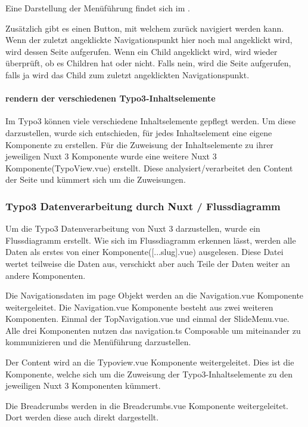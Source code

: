 Eine Darstellung der Menüführung findet sich im . 

Zusätzlich gibt es einen Button, mit welchem zurück navigiert werden kann. Wenn der zuletzt angeklickte Navigationspunkt hier noch mal angeklickt wird, wird dessen Seite aufgerufen. Wenn ein Child angeklickt wird, wird wieder überprüft, ob es Children hat oder nicht. Falls nein, wird die Seite aufgerufen, falls ja wird das Child zum zuletzt angeklickten Navigationspunkt. 

\paragraph{rendern der verschiedenen Typo3-Inhaltselemente}
Im Typo3 können viele verschiedene Inhaltselemente gepflegt werden. Um diese darzustellen, wurde sich entschieden, für jedes Inhaltselement eine eigene Komponente zu erstellen. Für die Zuweisung der Inhaltselemente zu ihrer jeweiligen Nuxt 3 Komponente wurde eine weitere Nuxt 3 Komponente(TypoView.vue) erstellt. Diese analysiert/verarbeitet den Content der Seite und kümmert sich um die Zuweisungen.

\subsubsection{Typo3 Datenverarbeitung durch Nuxt / Flussdiagramm}
\label{sec:Typo3 Datenverarbeitung durch Nuxt / Flussdiagramm} 

Um die Typo3 Datenverarbeitung von Nuxt 3 darzustellen, wurde ein Flussdiagramm erstellt. Wie sich im Flussdiagramm erkennen lässt, werden alle Daten als erstes von einer Komponente([...slug].vue) ausgelesen. Diese Datei wertet teilweise die Daten aus, verschickt aber auch Teile der Daten weiter an andere Komponenten. 

Die Navigationsdaten im page Objekt werden an die Navigation.vue Komponente weitergeleitet. Die Navigation.vue Komponente besteht aus zwei weiteren Komponenten. Einmal der TopNavigation.vue und einmal der SlideMenu.vue. Alle drei Komponenten nutzen das navigation.ts Composable um miteinander zu kommunizieren und die Menüführung darzustellen.

Der Content wird an die Typoview.vue Komponente weitergeleitet. Dies ist die Komponente, welche sich um die Zuweisung der Typo3-Inhaltselemente zu den jeweiligen Nuxt 3 Komponenten kümmert. 

Die Breadcrumbs werden in die Breadcrumbs.vue Komponente weitergeleitet. Dort werden diese auch direkt dargestellt. 

